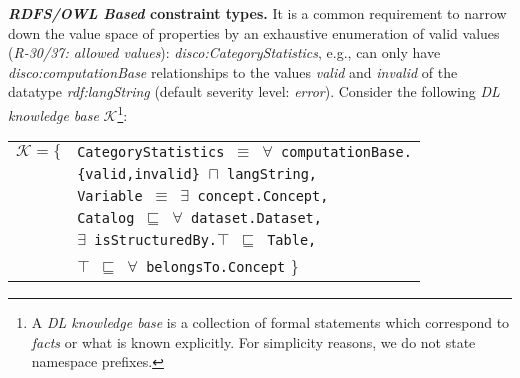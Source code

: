 \documentclass[conference]{IEEEtran}
\newcommand{\ms}[1]{\texttt{#1}}
\newenvironment{DL}{
  \small
  \vspace{0cm}
	\begin{center}
  \begin{tabular}{c l}

}{
  \end{tabular}
	\end{center}
}
\begin{document}
\textbf{\emph{RDFS/OWL Based} constraint types.}
It is a common requirement to narrow down the value space of properties by an exhaustive enumeration of valid values (\emph{R-30/37: allowed values}):
\emph{disco:CategoryStatistics}, e.g., can only have \emph{disco:computationBase} relationships to the values \emph{valid} and \emph{invalid} of the datatype \emph{rdf:langString} (default severity level: \emph{error}).
Consider the following \emph{DL knowledge base} $\mathcal{K}$\footnote{A \emph{DL knowledge base} is a collection of formal statements which correspond to \emph{facts} or what is known explicitly. For simplicity reasons, we do not state namespace prefixes.}:
\begin{center}
\begin{DL} 
$\mathcal{K}=\{$ 
&{\small\ms{CategoryStatistics $\equiv$ $\forall$ computationBase.}} \\
	&{\small\ms{\{valid,invalid\} $\sqcap$ langString,}} \\
  &{\small\ms{Variable $\equiv$ $\exists$ concept.Concept,}} \\
	&{\small\ms{Catalog $\sqsubseteq$ $\forall$ dataset.Dataset,}} \\
  &{\small\ms{$\exists$ isStructuredBy.$\top$ $\sqsubseteq$ Table,}} \\
	&{\small\ms{$\top$ $\sqsubseteq$ $\forall$ belongsTo.Concept}}
\}\\ 
\end{DL}
\end{center}
\end{document}
